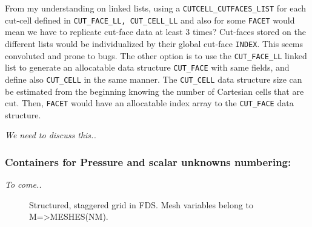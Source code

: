 \documentclass[12pt]{article}
\begin{document}
From my understanding on linked lists, using a \texttt{CUTCELL\_CUTFACES\_LIST} for each cut-cell defined in \texttt{CUT\_FACE\_LL, CUT\_CELL\_LL} and also for some \texttt{FACET} would mean we have to replicate cut-face data at least 3 times? Cut-faces stored on the different lists would be individualized by their global cut-face \texttt{INDEX}. This seems convoluted and prone to bugs.
The other option is to use the \texttt{CUT\_FACE\_LL} linked list to generate an allocatable data structure \texttt{CUT\_FACE} with same fields, and define also \texttt{CUT\_CELL} in the same manner. The \texttt{CUT\_CELL} data structure size can be estimated from the beginning knowing the number of Cartesian cells that are cut. Then, \texttt{FACET} would have an allocatable index array to the \texttt{CUT\_FACE} data structure.

\textit{We need to discuss this..}


\subsubsection*{Containers for Pressure and scalar unknowns numbering:}

\textit{To come..}

\newpage




\begin{figure}
\begin{center}
\caption{Structured, staggered grid in FDS.  Mesh variables belong to {\ct M=>MESHES(NM)}. }
\label{fig:struc_stag_grid}
\end{center}
\end{figure}
\end{document}
